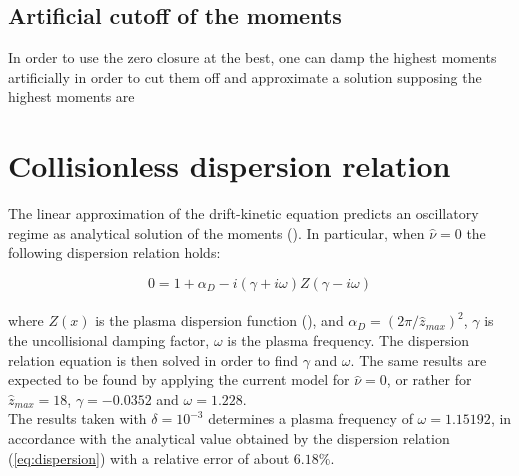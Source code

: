 \documentclass[final]{jpp}
\begin{document}
\subsection{Artificial cutoff of the moments}

In order to use the zero closure at the best, one can damp the highest moments artificially in order to cut them off and approximate a solution supposing the highest moments are 

\section{Collisionless dispersion relation} \label{sec:dispertion}

The linear approximation of the drift-kinetic equation predicts an oscillatory regime as analytical solution of the moments (\cite{linear}). In particular, when $\hat{\nu} = 0$ the following dispersion relation holds:

\begin{equation}\label{eq:dispersion}
0 = 1 + \alpha_D - i (\gamma + i\omega)Z(\gamma - i \omega)
\end{equation}
\\
where $Z(x)$ is the plasma dispersion function (\cite{linear}), and $\alpha_D = (2\pi/\hat{z}_{max})^2$, $\gamma$ is the uncollisional damping factor, $\omega$ is the plasma frequency.
The dispersion relation equation is then solved in order to find $\gamma$ and $\omega$.
The same results are expected to be found by applying the current model for $\hat{\nu} = 0$, or rather for $\hat{z}_{max} = 18$, $\gamma = -0.0352$ and $\omega = 1.228$.
\\
The results taken with $\delta = 10^{-3}$ determines a plasma frequency of $\omega = 1.15192$, in accordance with the analytical value obtained by the dispersion relation (\ref{eq:dispersion}) with a relative error of about $6.18\%$.
\end{document}
